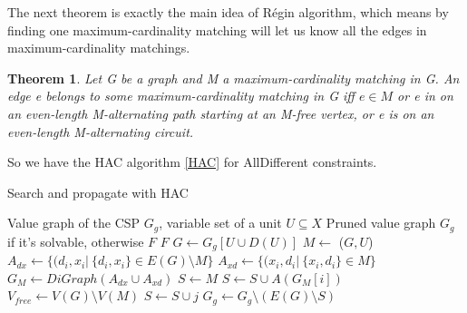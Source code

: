 \documentclass[a4paper, 12pt]{report}
\newtheorem{theorem}{Theorem}[subsection]
\begin{document}
            The next theorem is exactly the main idea of Régin algorithm, which means by finding one maximum-cardinality matching will let us know all the edges in maximum-cardinality matchings.

            \begin{theorem}
                Let G be a graph and M a maximum-cardinality matching in G. An edge e belongs to some maximum-cardinality matching in G iff $e\in M$ or e in on an even-length M-alternating path starting at an M-free vertex, or e is on an even-length M-alternating circuit.
            \end{theorem}

            So we have the HAC algorithm \ref{HAC} for AllDifferent constraints.

            \begin{algorithm}
                \caption{Search and propagate with HAC}
                \label{HAC}
                \begin{algorithmic}[1]
                    \Require Value graph of the CSP $G_g$, variable set of a unit $U\subseteq X$
                    \Ensure Pruned value graph $G_g$ if it's solvable, otherwise $F$
                            \State \Return $F$
                        \EndIf
                        \State $G\leftarrow G_g[U\cup D(U)]$ 
                        \State $M\leftarrow$ ($G, U$)
                        \State $A_{dx}\leftarrow \{(d_i,x_i|\ \{d_i,x_i\}\in E(G)\setminus M \}$
                        \State $A_{xd}\leftarrow \{(x_i,d_i|\ \{x_i,d_i\}\in M\}$ 
                        \State $G_M\leftarrow DiGraph(A_{dx}\cup A_{xd})$
                        \State $S\leftarrow M$
                            \State $S \leftarrow S\cup A(G_M[i])$
                        \EndFor
                        \State $V_{free} \leftarrow V(G)\setminus V(M)$
                             
                                    \State $S\leftarrow S\cup j$
                                \EndFor
                            \EndFor
                        \EndIf
                        \State $G_g\leftarrow G_g \setminus(E(G)\setminus S)$
                    \EndFunction
                \end{algorithmic}
            \end{algorithm}
\end{document}
